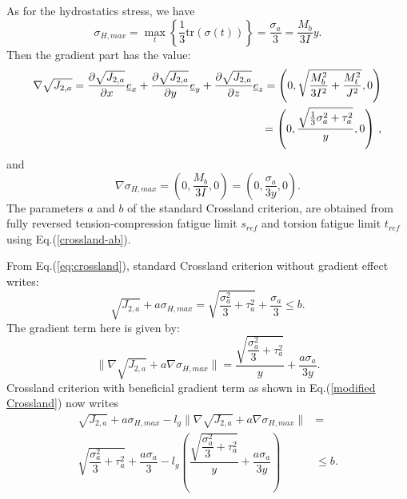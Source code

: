 As for the  hydrostatics stress, we have
\begin{equation}
	\sigma_{H,max}=\max\limits_{t}\left\lbrace \dfrac{1}{3}\textrm{tr}(\sigma(t))\right\rbrace =\dfrac{\sigma_{a}}{3}=\dfrac{M_b}{3I}y .
\end{equation}
Then the gradient part has the value:
\begin{equation}
	\begin{split}
		\nabla\sqrt{J_{2,a}}=\dfrac{\partial\sqrt{J_{2,a}}}{\partial x}\uline{e}_x+\dfrac{\partial\sqrt{J_{2,a}}}{\partial y}\uline{e}_y+\dfrac{\partial\sqrt{J_{2,a}}}{\partial z}\uline{e}_z=\left( 0,\sqrt{\dfrac{M_b^2}{3I^2}+\dfrac{M_t^2}{J^2}},0\right) \\=\left( 0,\dfrac{\sqrt{\frac{1}{3}\sigma_a^2+\tau_a^2}}{y},0\right) \, ,
	\end{split}
\end{equation}
and
\begin{equation}
	\nabla \sigma_{H,max}=\left( 0,\dfrac{M_b}{3I},0\right) =\left( 0,\dfrac{\sigma_a}{3y},0\right) .
\end{equation}
The parameters $a$ and $b$ of the standard Crossland criterion, are obtained from fully reversed tension-compression fatigue limit $s_{ref}$  and torsion fatigue limit $t_{ref}$ using Eq.(\ref{crossland-ab}).

\noindent From Eq.(\ref{eq:crossland}), standard Crossland criterion without gradient effect writes:
\begin{equation}
	\sqrt{J_{2,a}}+a\sigma_{H,max}=\sqrt{\dfrac{\sigma_a^2}{3}+\tau_a^2}+\dfrac{\sigma_a}{3}\leqslant b.
	\label{eqrbcross}
\end{equation}
The gradient term here is given by:
\begin{equation}
	\parallel{\nabla\sqrt{J_{2,a}}}+a{\nabla \sigma_{H,max}}\parallel= \dfrac{\sqrt{\dfrac{\sigma_a^2}{3}+\tau_a^2}}{y}+\dfrac{a\sigma_a}{3y}.
\end{equation}
Crossland criterion with beneficial gradient term as shown in Eq.(\ref{modified Crossland}) now writes
\begin{equation}
	\begin{split}
		\sqrt{J_{2,a}}+a\sigma_{H,max}-l_g\parallel{\nabla\sqrt{J_{2,a}}}+a\nabla{\sigma_{H,max}}\parallel&=\\\sqrt{\dfrac{\sigma_a^2}{3}+\tau_a^2}+\dfrac{a\sigma_a}{3}-l_g\left( \dfrac{\sqrt{\dfrac{\sigma_a^2}{3}+\tau_a^2}}{y}+\dfrac{a\sigma_a}{3y}\right) &\leqslant b.
	\end{split}
\end{equation}
